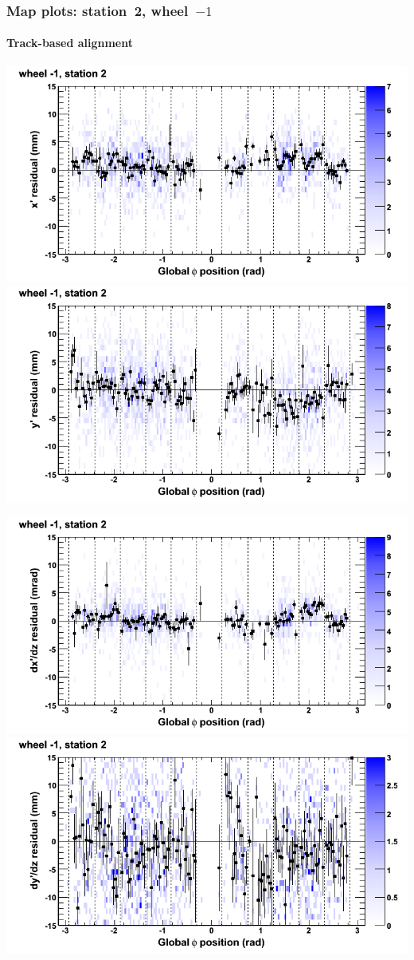 \documentclass[compress]{beamer}
\begin{document}
\begin{frame}
\frametitle{Map plots: station~2, wheel~$-1$}
\framesubtitle{Track-based alignment}
\includegraphics[width=0.5\linewidth]{mapplots_re05/DTvsphi_st2whB_x.png}
\includegraphics[width=0.5\linewidth]{mapplots_re05/DTvsphi_st2whB_y.png}

\includegraphics[width=0.5\linewidth]{mapplots_re05/DTvsphi_st2whB_dxdz.png}
\includegraphics[width=0.5\linewidth]{mapplots_re05/DTvsphi_st2whB_dydz.png}
\end{frame}
\end{document}
